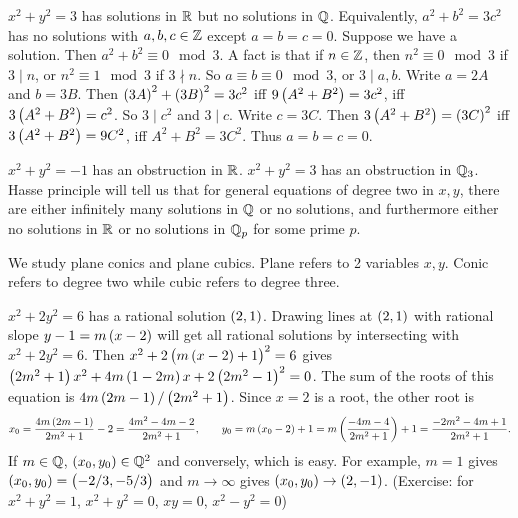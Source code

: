\begin{example*}
$ x^2 + y^2 = 3 $ has solutions in $ \mathbb{R} $ but no solutions in $ \mathbb{Q} $. Equivalently, $ a^2 + b^2 = 3c^2 $ has no solutions with $ a, b, c \in \mathbb{Z} $ except $ a = b = c = 0 $. Suppose we have a solution. Then $ a^2 + b^2 \equiv 0 \mod 3 $. A fact is that if $ n \in \mathbb{Z} $, then $ n^2 \equiv 0 \mod 3 $ if $ 3 \mid n $, or $ n^2 \equiv 1 \mod 3 $ if $ 3 \nmid n $. So $ a \equiv b \equiv 0 \mod 3 $, or $ 3 \mid a, b $. Write $ a = 2A $ and $ b = 3B $. Then $ \br{3A}^2 + \br{3B}^2 = 3c^2 $ iff $ 9\br{A^2 + B^2} = 3c^2 $, iff $ 3\br{A^2 + B^2} = c^2 $. So $ 3 \mid c^2 $ and $ 3 \mid c $. Write $ c = 3C $. Then $ 3\br{A^2 + B^2} = \br{3C}^2 $ iff $ 3\br{A^2 + B^2} = 9C^2 $, iff $ A^2 + B^2 = 3C^2 $. Thus $ a = b = c = 0 $.
\end{example*}

$ x^2 + y^2 = -1 $ has an obstruction in $ \mathbb{R} $. $ x^2 + y^2 = 3 $ has an obstruction in $ \mathbb{Q}_3 $. Hasse principle will tell us that for general equations of degree two in $ x, y $, there are either infinitely many solutions in $ \mathbb{Q} $ or no solutions, and furthermore either no solutions in $ \mathbb{R} $ or no solutions in $ \mathbb{Q}_p $ for some prime $ p $.


We study plane conics and plane cubics. Plane refers to 2 variables $ x, y $. Conic refers to degree two while cubic refers to degree three.

\begin{example*}
$ x^2 + 2y^2 = 6 $ has a rational solution $ \br{2, 1} $. Drawing lines at $ \br{2, 1} $ with rational slope $ y - 1 = m\br{x - 2} $ will get all rational solutions by intersecting with $ x^2 + 2y^2 = 6 $. Then $ x^2 + 2\br{m\br{x - 2} + 1}^2 = 6 $ gives $ \br{2m^2 + 1}x^2 + 4m\br{1 - 2m}x + 2\br{2m^2 - 1}^2 = 0 $. The sum of the roots of this equation is $ 4m\br{2m - 1} / \br{2m^2 + 1} $. Since $ x = 2 $ is a root, the other root is
$$ x_0 = \dfrac{4m\br{2m - 1}}{2m^2 + 1} - 2 = \dfrac{4m^2 - 4m - 2}{2m^2 + 1}, \qquad y_0 = m\br{x_0 - 2} + 1 = m\br{\dfrac{-4m - 4}{2m^2 + 1}} + 1 = \dfrac{-2m^2 - 4m + 1}{2m^2 + 1}. $$
If $ m \in \mathbb{Q} $, $ \br{x_0, y_0} \in \Q^2 $ and conversely, which is easy. For example, $ m = 1 $ gives $ \br{x_0, y_0} = \br{-2 / 3, -5 / 3} $ and $ m \to \infty $ gives $ \br{x_0, y_0} \to \br{2, -1} $. (Exercise: for $ x^2 + y^2 = 1 $, $ x^2 + y^2 = 0 $, $ xy = 0 $, $ x^2 - y^2 = 0 $)
\end{example*}

\pagebreak

